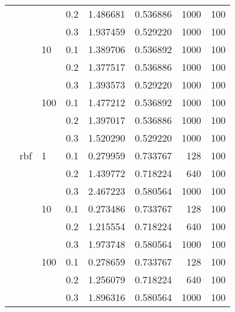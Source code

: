 \begin{table}[H]
\begin{tabular}{llllrrrr}
           &     &     & 0.2 &  1.486681 &  0.536886 &    1000 &   100 \\
           &     &     & 0.3 &  1.937459 &  0.529220 &    1000 &   100 \\
           &     & 10  & 0.1 &  1.389706 &  0.536892 &    1000 &   100 \\
           &     &     & 0.2 &  1.377517 &  0.536886 &    1000 &   100 \\
           &     &     & 0.3 &  1.393573 &  0.529220 &    1000 &   100 \\
           &     & 100 & 0.1 &  1.477212 &  0.536892 &    1000 &   100 \\
           &     &     & 0.2 &  1.397017 &  0.536886 &    1000 &   100 \\
           &     &     & 0.3 &  1.520290 &  0.529220 &    1000 &   100 \\
           & rbf & 1   & 0.1 &  0.279959 &  0.733767 &     128 &   100 \\
           &     &     & 0.2 &  1.439772 &  0.718224 &     640 &   100 \\
           &     &     & 0.3 &  2.467223 &  0.580564 &    1000 &   100 \\
           &     & 10  & 0.1 &  0.273486 &  0.733767 &     128 &   100 \\
           &     &     & 0.2 &  1.215554 &  0.718224 &     640 &   100 \\
           &     &     & 0.3 &  1.973748 &  0.580564 &    1000 &   100 \\
           &     & 100 & 0.1 &  0.278659 &  0.733767 &     128 &   100 \\
           &     &     & 0.2 &  1.256079 &  0.718224 &     640 &   100 \\
           &     &     & 0.3 &  1.896316 &  0.580564 &    1000 &   100 \\
\bottomrule
\end{tabular}
\end{table}
